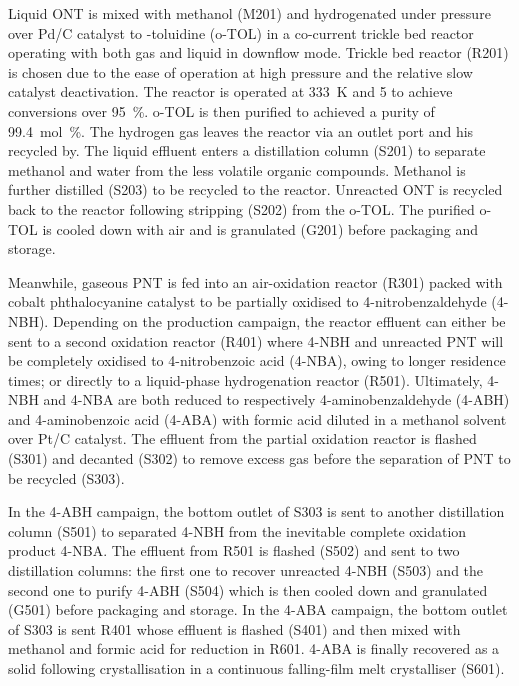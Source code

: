 Liquid ONT is mixed with methanol (M201) and hydrogenated under pressure over Pd/C catalyst to \ortho-toluidine (o-TOL) in a co-current trickle bed reactor operating with both gas and liquid in downflow mode. Trickle bed reactor (R201) is chosen due to the ease of operation at high pressure and the relative slow catalyst deactivation. The reactor is operated at \SI{333}{\K} and \SI{5}{\atm} to achieve conversions over \SI{95}{\percent}. o-TOL is then purified to achieved a purity of \SI{99.4}{\mol\percent}. The hydrogen gas leaves the reactor via an outlet port and his recycled by. The liquid effluent enters a distillation column (S201) to separate methanol and water from the less volatile organic compounds. Methanol is further distilled (S203) to be recycled to the reactor. Unreacted ONT is recycled back to the reactor following stripping (S202) from the o-TOL. The purified o-TOL is cooled down with air and is granulated (G201) before packaging and storage.

Meanwhile, gaseous PNT is fed into an air-oxidation reactor (R301) packed with cobalt phthalocyanine catalyst to be partially oxidised to 4-nitrobenzaldehyde (4-NBH). Depending on the production campaign, the reactor effluent can either be sent to a second oxidation reactor (R401) where 4-NBH and unreacted PNT will be completely oxidised to 4-nitrobenzoic acid (4-NBA), owing to longer residence times; or directly to a liquid-phase hydrogenation reactor (R501). Ultimately, 4-NBH and 4-NBA are both reduced to respectively 4-aminobenzaldehyde (4-ABH) and 4-aminobenzoic acid (4-ABA) with formic acid diluted in a methanol solvent over Pt/C catalyst. The effluent from the partial oxidation reactor is flashed (S301) and decanted (S302) to remove excess gas before the separation of PNT to be recycled (S303). 

In the 4-ABH campaign, the bottom outlet of S303 is sent to another distillation column (S501) to separated 4-NBH from the inevitable complete oxidation product 4-NBA. The effluent from R501 is flashed (S502) and sent to two distillation columns: the first one to recover unreacted 4-NBH (S503) and the second one to purify 4-ABH (S504) which is then cooled down and granulated (G501) before packaging and storage.  
In the 4-ABA campaign, the bottom outlet of S303 is sent R401 whose effluent is flashed (S401) and then mixed with methanol and formic acid for reduction in R601. 4-ABA is finally recovered as a solid following  crystallisation in a continuous falling-film melt crystalliser (S601).

